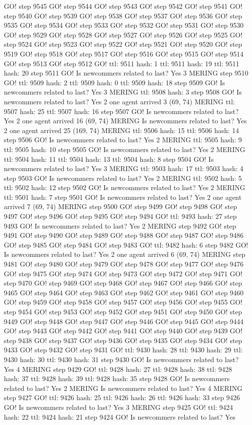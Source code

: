 GO! step 9545 GO! step 9544 GO! step 9543 GO! step 9542 GO! step 9541 GO! step 9540 GO! step 9539 GO! step 9538 GO! step 9537 GO! step 9536 GO! step 9535 GO! step 9534 GO! step 9533 GO! step 9532 GO! step 9531 GO! step 9530 GO! step 9529 GO! step 9528 GO! step 9527 GO! step 9526 GO! step 9525 GO! step 9524 GO! step 9523 GO! step 9522 GO! step 9521 GO! step 9520 GO! step 9519 GO! step 9518 GO! step 9517 GO! step 9516 GO! step 9515 GO! step 9514 GO! step 9513 GO! step 9512 GO! ttl: 9511 hash: 1 ttl: 9511 hash: 19 ttl: 9511 hash: 20 step 9511 GO! Is newcommers related to last? Yes 3 MERING step 9510 GO! ttl: 9509 hash: 2 ttl: 9509 hash: 0 ttl: 9509 hash: 18 step 9509 GO! Is newcommers related to last? Yes 3 MERING ttl: 9508 hash: 3 step 9508 GO! Is newcommers related to last? Yes 2 one agent arrived 3 (69, 74) MERING ttl: 9507 hash: 25 ttl: 9507 hash: 16 step 9507 GO! Is newcommers related to last? Yes 2 one agent arrived 16 (69, 74) MERING Is newcommers related to last? Yes 2 one agent arrived 25 (169, 74) MERING ttl: 9506 hash: 15 ttl: 9506 hash: 14 step 9506 GO! Is newcommers related to last? Yes 2 MERING ttl: 9505 hash: 9 ttl: 9505 hash: 10 step 9505 GO! Is newcommers related to last? Yes 2 MERING ttl: 9504 hash: 11 ttl: 9504 hash: 13 ttl: 9504 hash: 8 step 9504 GO! Is newcommers related to last? Yes 3 MERING ttl: 9503 hash: 17 ttl: 9503 hash: 4 step 9503 GO! Is newcommers related to last? Yes 2 MERING ttl: 9502 hash: 5 ttl: 9502 hash: 12 step 9502 GO! Is newcommers related to last? Yes 2 MERING ttl: 9501 hash: 7 step 9501 GO! Is newcommers related to last? Yes 2 one agent arrived 7 (69, 74) MERING step 9500 GO! step 9499 GO! step 9498 GO! step 9497 GO! step 9496 GO! step 9495 GO! step 9494 GO! ttl: 9493 hash: 27 step 9493 GO! Is newcommers related to last? Yes 2 MERING step 9492 GO! step 9491 GO! step 9490 GO! step 9489 GO! step 9488 GO! step 9487 GO! step 9486 GO! step 9485 GO! step 9484 GO! step 9483 GO! ttl: 9482 hash: 6 step 9482 GO! Is newcommers related to last? Yes 2 one agent arrived 6 (69, 74) MERING step 9481 GO! step 9480 GO! step 9479 GO! step 9478 GO! step 9477 GO! step 9476 GO! step 9475 GO! step 9474 GO! step 9473 GO! step 9472 GO! step 9471 GO! step 9470 GO! step 9469 GO! step 9468 GO! step 9467 GO! step 9466 GO! step 9465 GO! step 9464 GO! step 9463 GO! step 9462 GO! step 9461 GO! step 9460 GO! step 9459 GO! step 9458 GO! step 9457 GO! step 9456 GO! step 9455 GO! step 9454 GO! step 9453 GO! step 9452 GO! step 9451 GO! step 9450 GO! step 9449 GO! step 9448 GO! step 9447 GO! step 9446 GO! step 9445 GO! step 9444 GO! step 9443 GO! step 9442 GO! step 9441 GO! step 9440 GO! step 9439 GO! step 9438 GO! step 9437 GO! step 9436 GO! step 9435 GO! step 9434 GO! step 9433 GO! step 9432 GO! step 9431 GO! ttl: 9430 hash: 28 ttl: 9430 hash: 29 ttl: 9430 hash: 30 ttl: 9430 hash: 31 step 9430 GO! Is newcommers related to last? Yes 4 MERING step 9429 GO! ttl: 9428 hash: 27 ttl: 9428 hash: 38 ttl: 9428 hash: 37 ttl: 9428 hash: 39 ttl: 9428 hash: 35 step 9428 GO! Is newcommers related to last? Yes 2 MERING Is newcommers related to last? Yes 4 MERING step 9427 GO! ttl: 9426 hash: 25 ttl: 9426 hash: 26 ttl: 9426 hash: 33 step 9426 GO! Is newcommers related to last? Yes 3 MERING step 9425 GO! ttl: 9424 hash: 22 ttl: 9424 hash: 21 step 9424 GO! Is newcommers related to last? Yes 